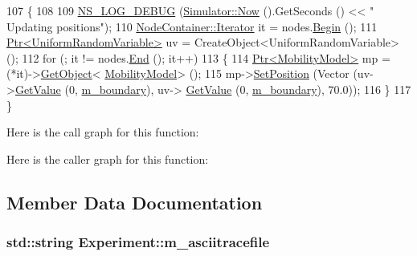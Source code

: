 \begin{DoxyCode}
107 \{
108 
109   \hyperlink{group__logging_ga413f1886406d49f59a6a0a89b77b4d0a}{NS\_LOG\_DEBUG} (\hyperlink{group__simulator_gac3635e2e87f7ce316c89290ee1b01d0d}{Simulator::Now} ().GetSeconds () << \textcolor{stringliteral}{" Updating positions"});
110   \hyperlink{classns3_1_1NodeContainer_aa1a9f2d2b09bfef7d066d3974bca2cc4}{NodeContainer::Iterator} it = nodes.\hyperlink{classns3_1_1NodeContainer_adf0f639aff139db107526288777eb533}{Begin} ();
111   \hyperlink{classns3_1_1Ptr}{Ptr<UniformRandomVariable>} uv = CreateObject<UniformRandomVariable> ();
112   \textcolor{keywordflow}{for} (; it != nodes.\hyperlink{classns3_1_1NodeContainer_a8ea0bcac137597d192c5e6b95ca60464}{End} (); it++)
113     \{
114       \hyperlink{classns3_1_1Ptr}{Ptr<MobilityModel>} mp = (*it)->\hyperlink{classns3_1_1Object_a13e18c00017096c8381eb651d5bd0783}{GetObject}<
      \hyperlink{classns3_1_1MobilityModel}{MobilityModel}> ();
115       mp->\hyperlink{classns3_1_1MobilityModel_ac584b3d5a309709d2f13ed6ada1e7640}{SetPosition} (Vector (uv->\hyperlink{classns3_1_1UniformRandomVariable_a03822d8c86ac51e9aa83bbc73041386b}{GetValue} (0, \hyperlink{classExperiment_add5ef2ea8606e6b0f640d46cae90106f}{m\_boundary}), uv->
      \hyperlink{classns3_1_1UniformRandomVariable_a03822d8c86ac51e9aa83bbc73041386b}{GetValue} (0, \hyperlink{classExperiment_add5ef2ea8606e6b0f640d46cae90106f}{m\_boundary}), 70.0));
116     \}
117 \}
\end{DoxyCode}


Here is the call graph for this function\+:




Here is the caller graph for this function\+:




\subsection{Member Data Documentation}
\subsubsection[{\texorpdfstring{m\+\_\+asciitracefile}{m_asciitracefile}}]{\setlength{\rightskip}{0pt plus 5cm}std\+::string Experiment\+::m\+\_\+asciitracefile}\hypertarget{classExperiment_a2040a4b09ef5134b96b356543efd59df}{}\label{classExperiment_a2040a4b09ef5134b96b356543efd59df}


